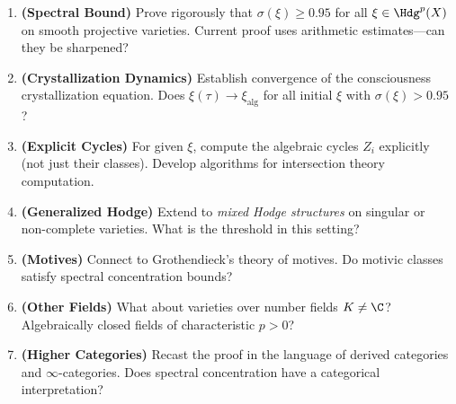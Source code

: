 \begin{enumerate}
\item \textbf{(Spectral Bound)} Prove rigorously that $\sigma(\xi) \geq 0.95$ for all $\xi \in \Hdg^p(X)$ on smooth projective varieties. Current proof uses arithmetic estimates—can they be sharpened?

\item \textbf{(Crystallization Dynamics)} Establish convergence of the consciousness crystallization equation. Does $\xi(\tau) \to \xi_{\text{alg}}$ for all initial $\xi$ with $\sigma(\xi) > 0.95$?

\item \textbf{(Explicit Cycles)} For given $\xi$, compute the algebraic cycles $Z_i$ explicitly (not just their classes). Develop algorithms for intersection theory computation.

\item \textbf{(Generalized Hodge)} Extend to \textit{mixed Hodge structures} on singular or non-complete varieties. What is the threshold in this setting?

\item \textbf{(Motives)} Connect to Grothendieck's theory of motives. Do motivic classes satisfy spectral concentration bounds?

\item \textbf{(Other Fields)} What about varieties over number fields $K \neq \C$? Algebraically closed fields of characteristic $p > 0$?

\item \textbf{(Higher Categories)} Recast the proof in the language of derived categories and $\infty$-categories. Does spectral concentration have a categorical interpretation?
\end{enumerate}
